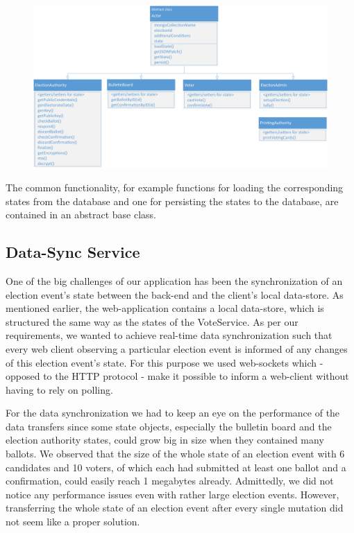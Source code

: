 \begin{figure}
\begin{center}
\includegraphics[scale=0.60]{assets/uml_actors.pdf}
\label{Actor classes}%
\end{center}
\end{figure}
The common functionality, for example functions for loading the corresponding states from the database and one for persisting the states to the database, are contained in an abstract base class.

\newpage
\subsection{Data-Sync Service}
One of the big challenges of our application has been the synchronization of an election event's state between the back-end and the client's local data-store. As mentioned earlier, the web-application contains a local data-store, which is structured the same way as the states of the VoteService. As per our requirements, we wanted to achieve real-time data synchronization such that every web client observing a particular election event is informed of any changes of this election event's state. For this purpose we used web-sockets which - opposed to the HTTP protocol - make it possible to inform a web-client without having to rely on polling.

For the data synchronization we had to keep an eye on the performance of the data transfers since some state objects, especially the bulletin board and the election authority states, could grow big in size when they contained many ballots. We observed that the size of the whole state of an election event with 6 candidates and 10 voters, of which each had submitted at least one ballot and a confirmation, could easily reach 1 megabytes already. Admittedly, we did not notice any performance issues even with rather large election events. However, transferring the whole state of an election event after every single mutation did not seem like a proper solution.

